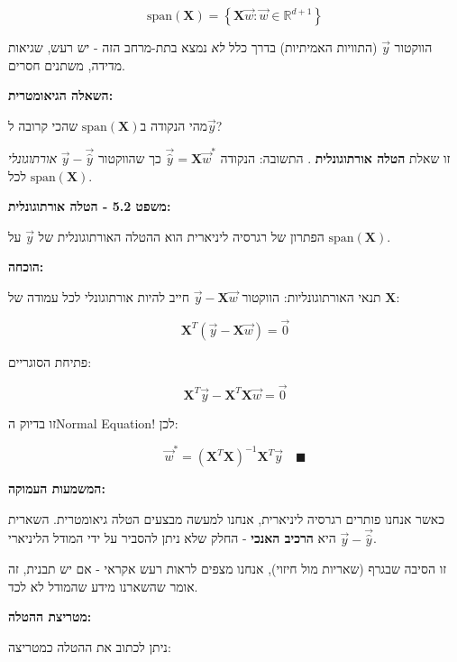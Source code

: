 \begin{equation}
\text{span}(\mathbf{X}) = \left\{ \mathbf{X}\vec{w} : \vec{w} \in \mathbb{R}^{d+1} \right\}
\end{equation}

הווקטור $\vec{y}$ (התוויות האמיתיות) בדרך כלל \textit{לא} נמצא בתת-מרחב הזה - יש רעש, שגיאות מדידה, משתנים חסרים.

\textbf{השאלה הגיאומטרית:}

מהי הנקודה ב\en{-}$\text{span}(\mathbf{X})$ שהכי קרובה ל\en{-}$\vec{y}$?

זו שאלת \textbf{הטלה אורתוגונלית} . התשובה: הנקודה $\vec{\hat{y}} = \mathbf{X}\vec{w}^*$ כך שהווקטור $\vec{y} - \vec{\hat{y}}$ \textit{אורתוגונלי} לכל $\text{span}(\mathbf{X})$.

\textbf{משפט \num{5.2} - הטלה אורתוגונלית:}

הפתרון של רגרסיה ליניארית הוא ההטלה האורתוגונלית של $\vec{y}$ על $\text{span}(\mathbf{X})$.

\textbf{הוכחה:}

תנאי האורתוגונליות: הווקטור $\vec{y} - \mathbf{X}\vec{w}$ חייב להיות אורתוגונלי לכל עמודה של $\mathbf{X}$:

\begin{equation}
\mathbf{X}^T(\vec{y} - \mathbf{X}\vec{w}) = \vec{0}
\end{equation}

פתיחת הסוגריים:

\begin{equation}
\mathbf{X}^T\vec{y} - \mathbf{X}^T\mathbf{X}\vec{w} = \vec{0}
\end{equation}

זו בדיוק ה\en{-}Normal Equation! לכן:

\begin{equation}
\vec{w}^* = (\mathbf{X}^T\mathbf{X})^{-1}\mathbf{X}^T\vec{y} \quad \blacksquare
\end{equation}

\textbf{המשמעות העמוקה:}

כאשר אנחנו פותרים רגרסיה ליניארית, אנחנו למעשה מבצעים הטלה גיאומטרית. השארית $\vec{y} - \vec{\hat{y}}$ היא \textbf{הרכיב האנכי} - החלק שלא ניתן להסביר על ידי המודל הליניארי.

זו הסיבה שבגרף  (שאריות מול חיזוי), אנחנו מצפים לראות רעש אקראי - אם יש תבנית, זה אומר שהשארנו מידע שהמודל לא לכד.

\textbf{מטריצת ההטלה:}

ניתן לכתוב את ההטלה כמטריצה:

